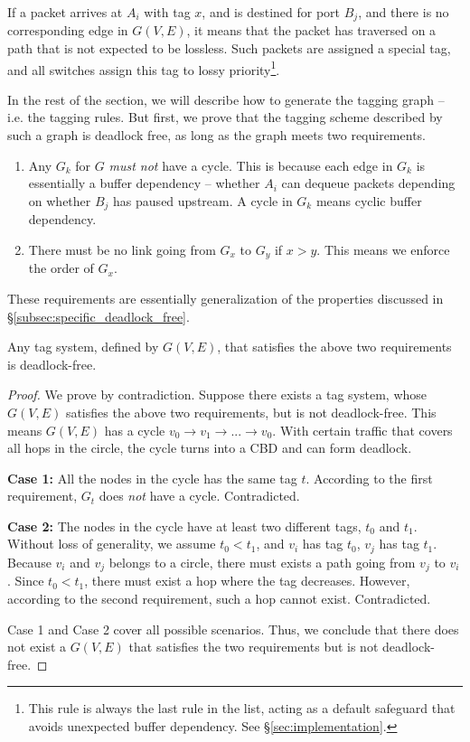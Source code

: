 If a packet arrives at $A_i$ with tag $x$, and is destined for port $B_j$, and
there is no corresponding edge in $G(V,E)$, it means that the packet has
traversed on a path that is not expected to be lossless.  Such packets are
assigned a special tag, and all switches assign this tag to lossy
priority\footnote{This rule is always the last rule in the 
list, acting as a default safeguard that avoids unexpected buffer dependency.
See \S\ref{sec:implementation}.}.

In the rest of the section, we will describe how to generate the tagging graph
-- i.e. the tagging rules. But first, we prove that the tagging scheme described
by such a graph is deadlock free, as long as the graph meets two requirements.

\begin{enumerate} 

		\item  Any $G_k$ for $G$ {\em must not} have a cycle.  This is
				because each edge in $G_k$ is essentially a buffer dependency --
				whether $A_i$ can dequeue packets depending on whether $B_j$ has
				paused upstream. A cycle in $G_k$ means cyclic buffer
				dependency.  
		\item There must be no link going from
				$G_x$ to $G_y$ if $x>y$.  This means we enforce the order of
				$G_x$.
\end{enumerate}

These requirements are essentially generalization of the properties
discussed in \S\ref{subsec:specific_deadlock_free}. 

\begin{theorem}
Any tag system, defined by $G(V,E)$, that satisfies the above two requirements is deadlock-free.
\end{theorem}

\begin{proof}
We prove by contradiction. Suppose there exists a tag system,
whose $G(V,E)$ satisfies the above two requirements, but is not deadlock-free. This means
$G(V,E)$ has a cycle $v_0 \rightarrow v_1 \rightarrow ... \rightarrow v_0$. With certain 
traffic that covers all hops in the circle, the cycle turns into a CBD and can form deadlock.

\textbf{Case 1:} All the nodes in the cycle has the same tag $t$. According to
the first requirement, $G_t$ does {\em not} have a cycle. Contradicted.

\textbf{Case 2:} The nodes in the cycle have at least two different tags, $t_0$ and $t_1$.
Without loss of generality, we assume $t_0 < t_1$, and $v_i$ has tag $t_0$, $v_j$
has tag $t_1$. Because $v_i$ and $v_j$ belongs to a circle, there must exists 
a path going from $v_j$ to $v_i$. Since $t_0 < t_1$, there must exist a hop where
the tag decreases. However, according to the second requirement, such a hop cannot
exist. Contradicted.

Case 1 and Case 2 cover all possible scenarios. Thus, we conclude that there does not 
exist a $G(V,E)$ that satisfies the two requirements but is not deadlock-free.
\end{proof}

